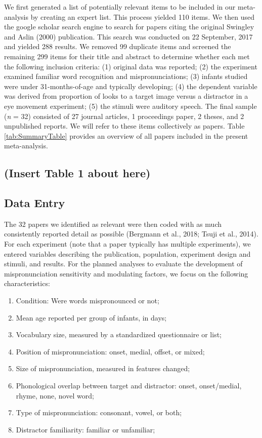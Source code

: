 \documentclass[man]{apa6}
\providecommand{\tightlist}{%
  \setlength{\itemsep}{0pt}\setlength{\parskip}{0pt}}
\begin{document}
We first generated a list of potentially relevant items to be included in our meta-analysis by creating an expert list. This process yielded 110 items. We then used the google scholar search engine to search for papers citing the original Swingley and Aslin (2000) publication. This search was conducted on 22 September, 2017 and yielded 288 results. We removed 99 duplicate items and screened the remaining 299 items for their title and abstract to determine whether each met the following inclusion criteria: (1) original data was reported; (2) the experiment examined familiar word recognition and mispronunciations; (3) infants studied were under 31-months-of-age and typically developing; (4) the dependent variable was derived from proportion of looks to a target image versus a distractor in a eye movement experiment; (5) the stimuli were auditory speech. The final sample (\emph{n} = 32) consisted of 27 journal articles, 1 proceedings paper, 2 theses, and 2 unpublished reports. We will refer to these items collectively as papers. Table \ref{tab:SummaryTable} provides an overview of all papers included in the present meta-analysis.

\hypertarget{insert-table-1-about-here}{%
\subsection{(Insert Table 1 about here)}\label{insert-table-1-about-here}}

\hypertarget{data-entry}{%
\subsection{Data Entry}\label{data-entry}}

The 32 papers we identified as relevant were then coded with as much consistently reported detail as possible (Bergmann et al., 2018; Tsuji et al., 2014). For each experiment (note that a paper typically has multiple experiments), we entered variables describing the publication, population, experiment design and stimuli, and results. For the planned analyses to evaluate the development of mispronunciation sensitivity and modulating factors, we focus on the following characteristics:

\begin{enumerate}
\def\labelenumi{\arabic{enumi}.}
\tightlist
\item
  Condition: Were words mispronounced or not;
\item
  Mean age reported per group of infants, in days;
\item
  Vocabulary size, measured by a standardized questionnaire or list;
\item
  Position of mispronunciation: onset, medial, offset, or mixed;
\item
  Size of mispronunciation, measured in features changed;
\item
  Phonological overlap between target and distractor: onset, onset/medial, rhyme, none, novel word;
\item
  Type of mispronunciation: consonant, vowel, or both;
\item
  Distractor familiarity: familiar or unfamiliar;
\end{enumerate}
\end{document}
